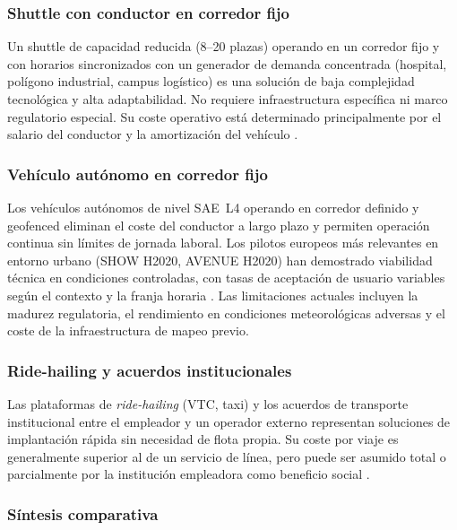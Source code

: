 \subsubsection{Shuttle con conductor en corredor fijo}
\label{sec:sol-shuttle-conductor}

Un shuttle de capacidad reducida (8--20 plazas) operando
en un corredor fijo y con horarios sincronizados con
un generador de demanda concentrada (hospital, polígono
industrial, campus logístico) es una solución de baja
complejidad tecnológica y alta adaptabilidad. No requiere
infraestructura específica ni marco regulatorio especial.
Su coste operativo está determinado principalmente por
el salario del conductor y la amortización del vehículo
\parencite{Stagecoach2020Hull}.

\subsubsection{Vehículo autónomo en corredor fijo}
\label{sec:sol-av}

Los vehículos autónomos de nivel SAE~L4 operando en
corredor definido y geofenced eliminan el coste del
conductor a largo plazo y permiten operación continua
sin límites de jornada laboral. Los pilotos europeos
más relevantes en entorno urbano (SHOW H2020, AVENUE H2020)
han demostrado viabilidad técnica en condiciones
controladas, con tasas de aceptación de usuario variables
según el contexto y la franja horaria
\parencite{SHOW2024Legacy}.
Las limitaciones actuales incluyen la madurez regulatoria,
el rendimiento en condiciones meteorológicas adversas
y el coste de la infraestructura de mapeo previo.

\subsubsection{Ride-hailing y acuerdos institucionales}
\label{sec:sol-ridehailing}

Las plataformas de \emph{ride-hailing} (VTC, taxi) y los
acuerdos de transporte institucional entre el empleador
y un operador externo representan soluciones de implantación
rápida sin necesidad de flota propia. Su coste por viaje
es generalmente superior al de un servicio de línea, pero
puede ser asumido total o parcialmente por la institución
empleadora como beneficio social \parencite{Stagecoach2020Hull, K2Centrum2025DRT}.

\subsubsection{Síntesis comparativa}
\label{sec:sol-sintesis}


